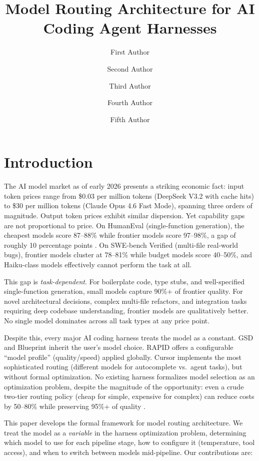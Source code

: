 \documentclass[11pt, a4paper, copyright]{googledeepmind}
\title{Model Routing Architecture for AI Coding Agent Harnesses}
\author[1]{First Author}
\author[2]{Second Author}
\author[2]{Third Author}
\author[1]{Fourth Author}
\author[1]{Fifth Author}
\affil[*]{Equal Contribution}
\affil[1]{Affiliation 1}
\affil[2]{Affiliation 2}
\begin{document}
\maketitle

\section{Introduction}
\label{sec:intro}

The AI model market as of early 2026 presents a striking economic fact: input token prices range from \$0.03 per million tokens (DeepSeek V3.2 with cache hits) to \$30 per million tokens (Claude Opus 4.6 Fast Mode), spanning three orders of magnitude. Output token prices exhibit similar dispersion. Yet capability gaps are not proportional to price. On HumanEval (single-function generation), the cheapest models score 87--88\% while frontier models score 97--98\%, a gap of roughly 10 percentage points \citep{chen2021codex}. On SWE-bench Verified (multi-file real-world bugs), frontier models cluster at 78--81\% while budget models score 40--50\%, and Haiku-class models effectively cannot perform the task at all.

This gap is \emph{task-dependent}. For boilerplate code, type stubs, and well-specified single-function generation, small models capture 90\%+ of frontier quality. For novel architectural decisions, complex multi-file refactors, and integration tasks requiring deep codebase understanding, frontier models are qualitatively better. No single model dominates across all task types at any price point.

Despite this, every major AI coding harness treats the model as a constant. GSD and Blueprint inherit the user's model choice. RAPID offers a configurable ``model profile'' (quality/speed) applied globally. Cursor implements the most sophisticated routing (different models for autocomplete vs.\ agent tasks), but without formal optimization. No existing harness formalizes model selection as an optimization problem, despite the magnitude of the opportunity: even a crude two-tier routing policy (cheap for simple, expensive for complex) can reduce costs by 50--80\% while preserving 95\%+ of quality \citep{routellm2025}.

This paper develops the formal framework for model routing architecture. We treat the model as a \emph{variable} in the harness optimization problem, determining which model to use for each pipeline stage, how to configure it (temperature, tool access), and when to switch between models mid-pipeline. Our contributions are:
\end{document}
